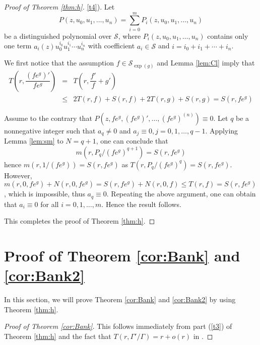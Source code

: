 \documentclass[reqno,12pt]{amsart}
\begin{document}
\begin{proof}[Proof of Theorem \ref{thm:h}]



 \ref{t4}).  Let $$P(z, u_0, u_1, \dots, u_n)=\sum_{i=0}^mP_i(z, u_0, u_1, \dots, u_n)$$ be a distinguished polynomial over $\mathcal{S}$, where $P_i(z, u_0, u_1, \dots, u_n)$ contains only one term $a_i(z)u_0^{i_0}u_1^{i_1}\cdots u_n^{i_n}$ with coefficient $a_i\in\mathcal{S}$ and $i=i_0+i_1+\cdots+i_n$. 

We first notice that the assumption $f\in\mathcal{S}_{\exp(g)}$ and Lemma \ref{lem:Cl} imply that 
\begin{eqnarray*} T\left(r, \dfrac{(fe^g)'}{fe^g}\right)
&=&T\left(r, \dfrac{f'}{f}+g'\right)\\
&\leq&2T(r, f)+S(r, f)+2T(r, g)+S(r, g)=S(r, fe^g)
\end{eqnarray*}

 
 Assume to the contrary that $P(z, fe^g, (fe^g)', \dots, (fe^g)^{(n)})\equiv 0$. Let $q$ be a nonnegative integer such that $a_q\neq 0$ and $a_j\equiv 0, j=0, 1, \dots, q-1$.  Applying Lemma \ref{lem:sm} to $N=q+1$,  one can conclude that $$m(r, P_q/(fe^g)^{q+1})=S(r, fe^g)$$ hence $m(r, 1/(fe^g))=S(r, fe^g)$ as $T(r, P_q/(fe^g)^q)=S(r, fe^g)$. However, $m(r, 0, fe^g)+N(r, 0, fe^g)=S(r, fe^g)+N(r, 0, f)\leq T(r, f)=S(r, fe^g)$, which is impossible, thus $a_q\equiv 0$. Repeating the above argument, one can obtain that $a_i\equiv 0$ for all $i=0, 1, \dots, m$. Hence the result follows.

This completes the proof of Theorem \ref{thm:h}.
\end{proof}

\section{Proof of Theorem \ref{cor:Bank} and \ref{cor:Bank2}}\label{sec:12}
In this section, we will prove Theorem \ref{cor:Bank} and \ref{cor:Bank2} by using Theorem \ref{thm:h}.
\begin{proof}[Proof of Theorem \ref{cor:Bank}]
 This follows immediately from part (\ref{t3}) of Theorem \ref{thm:h} and the fact that $T(r, \Gamma'/\Gamma)=r+o(r)$ in \cite{Bank76}.
 \end{proof}
 
\end{document}
